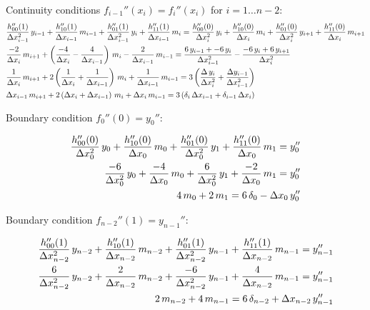
Continuity conditions $f_{i-1}''(x_{i}) = f_{i}''(x_{i})$ for $i = 1 \ldots n-2$:
%
\begin{align}
&\frac{h_{00}''(1)}{\Delta x_{i-1}^2}\,y_{i-1} + \frac{h_{10}''(1)}{\Delta x_{i-1}}\,m_{i-1} + \frac{h_{01}''(1)}{\Delta x_{i-1}^2}\,y_{i} + \frac{h_{11}''(1)}{\Delta x_{i-1}}\,m_{i} = \frac{h_{00}''(0)}{\Delta x_{i}^2}\,y_{i} + \frac{h_{10}''(0)}{\Delta x_{i}}\,m_{i} + \frac{h_{01}''(0)}{\Delta x_{i}^2}\,y_{i+1} + \frac{h_{11}''(0)}{\Delta x_{i}}\,m_{i+1} \notag \\
&\frac{-2}{\Delta x_{i}}\,m_{i+1} + \left(\frac{-4}{\Delta x_{i}} - \frac{4}{\Delta x_{i-1}}\right)\,m_{i} - \frac{2}{\Delta x_{i-1}}\,m_{i-1} = \frac{6\,y_{i-1} + -6\,y_{i}}{\Delta x_{i-1}^2} - \frac{-6\,y_{i} + 6\,y_{i+1}}{\Delta x_{i}^2} \notag \\
&\frac{1}{\Delta x_{i}}\,m_{i+1} + 2\left(\frac{1}{\Delta x_{i}} + \frac{1}{\Delta x_{i-1}}\right)\,m_{i} + \frac{1}{\Delta x_{i-1}}\,m_{i-1} = 3\left(\frac{\Delta\,y_{i}}{\Delta x_{i}^2} + \frac{\Delta y_{i-1}}{\Delta x_{i-1}^2}\right) \notag \\
&\Delta x_{i-1}\,m_{i+1} + 2\left(\Delta x_{i} + \Delta x_{i-1}\right)\,m_{i} + \Delta x_{i}\,m_{i-1} = 3\left(\delta_{i}\,\Delta x_{i-1} + \delta_{i-1}\,\Delta x_{i}\right)
\end{align}

Boundary condition $f_{0}''(0) = y_{0}''$:

\begin{align}
\frac{h_{00}''(0)}{\Delta x_{0}^2}\,y_{0} + \frac{h_{10}''(0)}{\Delta x_{0}}\,m_{0} + \frac{h_{01}''(0)}{\Delta x_{0}^2}\,y_{1} + \frac{h_{11}''(0)}{\Delta x_{0}}\,m_{1} = y_{0}''& \notag \\
\frac{-6}{\Delta x_{0}^2}\,y_{0} + \frac{-4}{\Delta x_{0}}\,m_{0} + \frac{6}{\Delta x_{0}^2}\,y_{1} + \frac{-2}{\Delta x_{0}}\,m_{1} = y_{0}''& \notag \\
4\,m_{0} + 2\,m_{1} = 6\,\delta_{0} - \Delta x_{0}\,y_{0}''&
\end{align}

Boundary condition $f_{n-2}''(1) = y_{n-1}''$:

\begin{align}
\frac{h_{00}''(1)}{\Delta x_{n-2}^2}\,y_{n-2} + \frac{h_{10}''(1)}{\Delta x_{n-2}}\,m_{n-2} + \frac{h_{01}''(1)}{\Delta x_{n-2}^2}\,y_{n-1} + \frac{h_{11}''(1)}{\Delta x_{n-2}}\,m_{n-1} = y_{n-1}''& \notag \\
\frac{6}{\Delta x_{n-2}^2}\,y_{n-2} + \frac{2}{\Delta x_{n-2}}\,m_{n-2} + \frac{-6}{\Delta x_{n-2}^2}\,y_{n-1} + \frac{4}{\Delta x_{n-2}}\,m_{n-1} = y_{n-1}''& \notag \\
2\,m_{n-2} + 4\,m_{n-1} = 6\,\delta_{n-2} + \Delta x_{n-2}\,y_{n-1}''&
\end{align}


